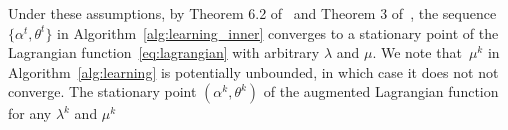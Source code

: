 \documentclass[11pt]{article}
\newtheorem{assumption}{Assumption}
\newtheorem{assumption}{Assumption}[section]
\newcommand{\bsnote}[1]{\noindent\textcolor{red}{\texttt{Bartolomeo: #1}}}
\begin{document}
Under these assumptions, by Theorem 6.2 of~\cite{Davis} and Theorem 3 of~\cite{path-diff},
the sequence $\{\alpha^{t},\theta^{t}\}$ in Algorithm~\ref{alg:learning_inner} converges to a stationary point of the Lagrangian function~\eqref{eq:lagrangian} with arbitrary $\lambda$ and $\mu$.
We note that~$\mu^k$ in Algorithm~\ref{alg:learning} is potentially unbounded, in which case it does not not converge.
The stationary point $(\alpha^{k},\theta^{k})$ of the augmented Lagrangian function for any $\lambda^k$ and $\mu^k$ 
\end{document}
